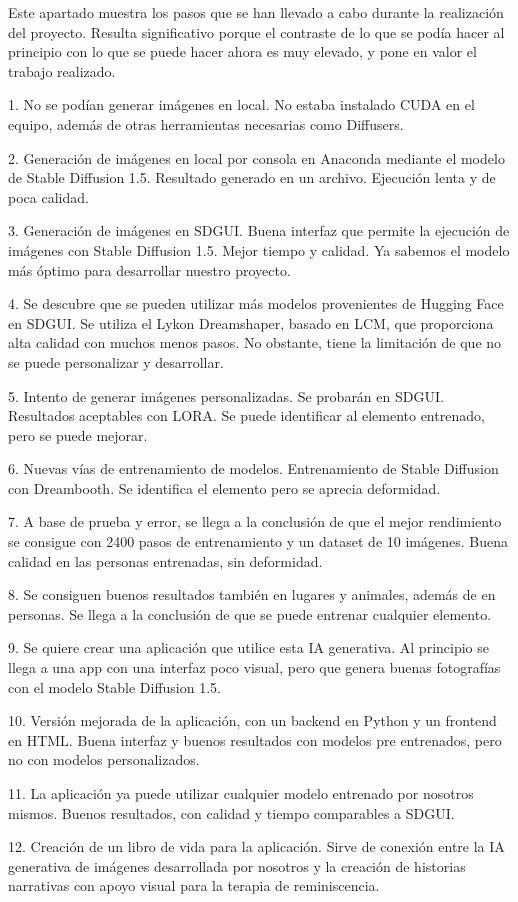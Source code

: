 Este apartado muestra los pasos que se han llevado a cabo durante la realización del proyecto. Resulta significativo porque el contraste de lo que se podía hacer al principio con lo que se puede hacer ahora es muy elevado, y pone en valor el trabajo realizado.

1. No se podían generar imágenes en local. No estaba instalado CUDA en el equipo, además de otras herramientas necesarias como Diffusers.

2. Generación de imágenes en local por consola en Anaconda mediante el modelo de Stable Diffusion 1.5. Resultado generado en un archivo. Ejecución lenta y de poca calidad.

3. Generación de imágenes en SDGUI. Buena interfaz que permite la ejecución de imágenes con Stable Diffusion 1.5. Mejor tiempo y calidad. Ya sabemos el modelo más óptimo para desarrollar nuestro proyecto.

4. Se descubre que se pueden utilizar más modelos provenientes de Hugging Face en SDGUI. Se utiliza el Lykon Dreamshaper, basado en LCM, que proporciona alta calidad con muchos menos pasos. No obstante, tiene la limitación de que no se puede personalizar y desarrollar.

5. Intento de generar imágenes personalizadas. Se probarán en SDGUI. Resultados aceptables con LORA. Se puede identificar al elemento entrenado, pero se puede mejorar.

6. Nuevas vías de entrenamiento de modelos. Entrenamiento de Stable Diffusion con Dreambooth. Se identifica el elemento pero se aprecia deformidad.

7. A base de prueba y error, se llega a la conclusión de que el mejor rendimiento se consigue con 2400 pasos de entrenamiento y un dataset de 10 imágenes. Buena calidad en las personas entrenadas, sin deformidad.

8. Se consiguen buenos resultados también en lugares y animales, además de en personas. Se llega a la conclusión de que se puede entrenar cualquier elemento.

9. Se quiere crear una aplicación que utilice esta IA generativa. Al principio se llega a una app con una interfaz poco visual, pero que genera buenas fotografías con el modelo Stable Diffusion 1.5.

10. Versión mejorada de la aplicación, con un backend en Python y un frontend en HTML. Buena interfaz y buenos resultados con modelos pre entrenados, pero no con modelos personalizados.

11. La aplicación ya puede utilizar cualquier modelo entrenado por nosotros mismos. Buenos resultados, con calidad y tiempo comparables a SDGUI.

12. Creación de un libro de vida para la aplicación. Sirve de conexión entre la IA generativa de imágenes desarrollada por nosotros y la creación de historias narrativas con apoyo visual para la terapia de reminiscencia.


